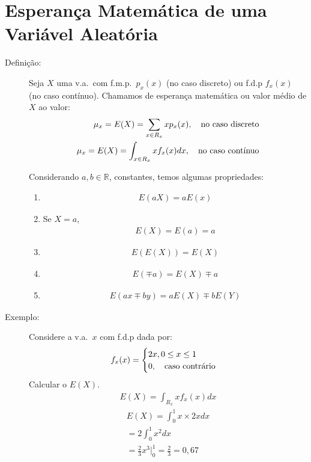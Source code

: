  \section{Esperança Matemática de uma Variável Aleatória}
 \begin{description}
   \item [Definição:] Seja $X$ uma v.a.\ com f.m.p.\ $p_{x}(x)$ (no caso discreto) ou f.d.p
     $f_{x}(x)$ (no caso contínuo). Chamamos de esperança matemática ou valor médio 
     de $X$ ao valor: 
     \begin{align}
       \mu_{x}= E(X)= \sum_{x \in R_{x}} x p_{x}(x) , 
       \text{\quad no caso discreto}\\
       \mu_{x}= E(X)= \int_{x \in R_{x}} x f_{x}(x)dx, \text{\quad no caso contínuo}
     \end{align}

     Considerando $a,b \in \mathbb{R}$, constantes, temos  algumas propriedades:

     \begin{enumerate}[label=(\alph*)]
       \item 
         \begin{align}
           E(aX)=aE(x)
         \end{align}
       \item Se $X=a$, 
         \begin{align}
           E(X)=E(a)=a
         \end{align}
       \item 
       \begin{align}    E(E(X))= E(X)\end{align}
       \item 
       \begin{align}  E(\mp a)=E(X)\mp a\end{align}
       \item 
       \begin{align}  E(ax\mp by)=aE(X)\mp b E(Y)\end{align}
     \end{enumerate}
   \item [Exemplo:]Considere a v.a.\ $x$ com f.d.p dada por: 
     \begin{align*}
       f_{x}(x)=\begin{cases}
         2x, 0\le x \le 1 \\
         0, \text{\quad caso contrário}
       \end{cases}
     \end{align*}
     Calcular o $E(X)$.
     \begin{align*}
       E(X)=\int_{R_{x}} x f_{x}(x)dx
     \end{align*}
     \begin{align*}
       E(X)=\int_{0}^{1} x\times 2xdx\\
       = 2 \int_{0}^{1} x^{2}dx \\
       = \frac{2}{3} x^{3} |^1_0 = \frac{2}{3}=0,67
     \end{align*}


\end{description}

